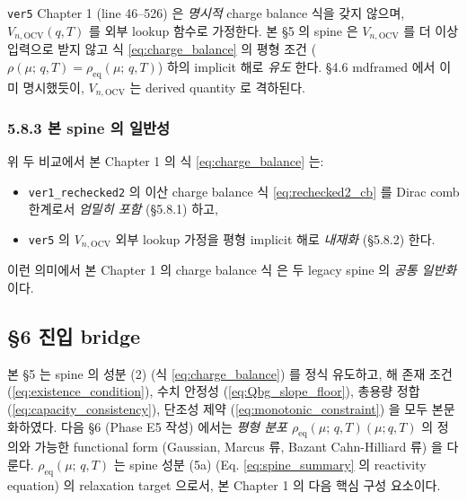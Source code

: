 \documentclass[11pt,a4paper]{article}
\newcommand{\OCV}{\mathrm{OCV}}
\newcommand{\eq}{\mathrm{eq}}
\newcommand{\mucont}{\mu}
\newcommand{\rhomu}{\rho(\mucont;\, q, T)}
\newcommand{\rhoeq}{\rho_{\eq}(\mucont;\, q, T)}
\begin{document}
\texttt{ver5} Chapter 1 (line 46--526) 은 \emph{명시적} charge balance 식을 갖지
않으며, $V_{n,\OCV}(q, T)$ 를 외부 lookup 함수로 가정한다. 본 \S 5 의 spine 은
$V_{n,\OCV}$ 를 더 이상 입력으로 받지 않고 식 \eqref{eq:charge_balance} 의 평형
조건 ($\rhomu = \rhoeq$) 하의 implicit 해로 \emph{유도} 한다. \S 4.6 mdframed 에서
이미 명시했듯이, $V_{n,\OCV}$ 는 derived quantity 로 격하된다.

\subsubsection*{5.8.3 본 spine 의 일반성}

위 두 비교에서 본 Chapter 1 의 식 \eqref{eq:charge_balance} 는:

\begin{itemize}
\item \texttt{ver1\_rechecked2} 의 이산 charge balance 식 \eqref{eq:rechecked2_cb}
      를 Dirac comb 한계로서 \emph{엄밀히 포함} (\S 5.8.1) 하고,
\item \texttt{ver5} 의 $V_{n,\OCV}$ 외부 lookup 가정을 평형 implicit 해로
      \emph{내재화} (\S 5.8.2) 한다.
\end{itemize}

이런 의미에서 본 Chapter 1 의 charge balance 식 은 두 legacy spine 의 \emph{공통
일반화} 이다.

\subsection{\S 6 진입 bridge}
\label{sec:section_5_to_6_bridge}

본 \S 5 는 spine 의 성분 (2) (식 \eqref{eq:charge_balance}) 를 정식 유도하고,
해 존재 조건 (\eqref{eq:existence_condition}), 수치 안정성 (\eqref{eq:Qbg_slope_floor}),
총용량 정합 (\eqref{eq:capacity_consistency}), 단조성 제약
(\eqref{eq:monotonic_constraint}) 을 모두 본문화하였다. 다음 \S 6 (Phase E5
작성) 에서는 \emph{평형 분포 $\rhoeq(\mucont; q, T)$} 의 정의와 가능한 functional
form (Gaussian, Marcus 류, Bazant Cahn-Hilliard 류) 을 다룬다. $\rhoeq$ 는 spine
성분 (5a) (Eq. \eqref{eq:spine_summary} 의 reactivity equation) 의 relaxation
target 으로서, 본 Chapter 1 의 다음 핵심 구성 요소이다.
\end{document}
